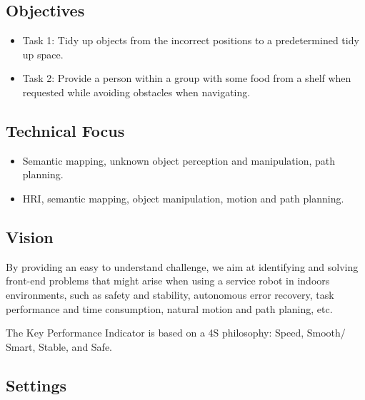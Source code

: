 \documentclass{article}
\begin{document}
\subsection{Objectives}
\begin{itemize}
    \item Task 1: Tidy up objects from the incorrect positions to a predetermined tidy up space.
    \item Task 2: Provide a person within a group with some food from a shelf when requested while avoiding obstacles when navigating.
\end{itemize}

\subsection{Technical Focus}
\begin{itemize}
    \item Semantic mapping, unknown object perception and manipulation, path planning.
    \item HRI, semantic mapping, object manipulation, motion and path planning.
\end{itemize}

\subsection{Vision}

By providing an easy to understand challenge, we aim at identifying and solving front-end problems that might arise when using a service robot in indoors environments, such as safety and stability, autonomous error recovery, task performance and time consumption, natural motion and path planing, etc.

The Key Performance Indicator is based on a 4S philosophy: Speed, Smooth/ Smart, Stable, and Safe.

\subsection{Settings}
\end{document}
